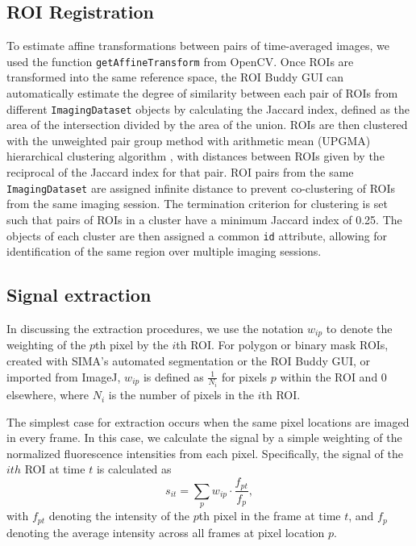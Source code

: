 \subsection{ROI Registration}
To estimate affine transformations between pairs of time-averaged images, we used the function
\verb|getAffineTransform| from OpenCV.
Once ROIs are transformed into the same reference space, the ROI Buddy GUI can automatically estimate
the degree of similarity between each pair of ROIs from different \verb|ImagingDataset| objects by calculating the Jaccard index,
defined as the area of the intersection divided by the area of the union.
ROIs are then clustered with the unweighted pair group method with arithmetic mean (UPGMA) hierarchical
clustering algorithm \citep{Sokal1958}, with distances between ROIs given by the reciprocal of the Jaccard index for that pair.
ROI pairs from the same \verb|ImagingDataset| are assigned infinite distance to prevent co-clustering of ROIs from the same imaging session. 
The termination criterion for clustering is set such that pairs of ROIs in a cluster have a minimum Jaccard index of 0.25.
The objects of each cluster are then assigned a common \verb|id| attribute, allowing for identification
of the same region over multiple imaging sessions.


\subsection{Signal extraction}\label{sec:sima:details:extraction}
In discussing the extraction procedures, 
we use the notation $w_{ip}$ to denote the weighting of the $p$th pixel by the $i$th ROI.
For polygon or binary mask ROIs, 
created with SIMA's automated segmentation or the ROI Buddy GUI, or imported from ImageJ,
$w_{ip}$ is defined as $\frac{1}{N_i}$ for pixels $p$ within the ROI and 0 elsewhere, where $N_i$ is the
number of pixels in the $i$th ROI.

The simplest case for extraction occurs when the same pixel locations are imaged in every frame.
In this case, we calculate the signal by a simple weighting of the normalized fluorescence intensities
from each pixel.
Specifically, the signal of the $ith$ ROI at time $t$ is calculated as
\begin{equation}\label{eq:extraction-basic}
    s_{it} = \sum_p w_{ip}\cdot \frac{f_{pt}}{f_p},
\end{equation}
with $f_{pt}$ denoting the intensity of the $p$th pixel in the frame at time $t$,
and $f_p$ denoting the average intensity across all frames at pixel location $p$.

